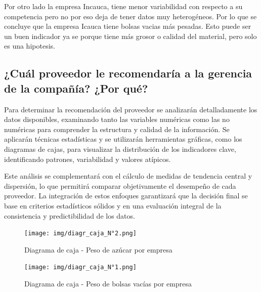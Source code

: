 \documentclass[12pt]{article}
\begin{document}
	Por otro lado la empresa Incauca, tiene menor variabilidad con respecto a su competencia pero no por eso deja de tener datos muy heterogéneos. 
    \vspace{0.5cm}
	Por lo que se concluye que la empresa Icauca tiene bolsas vacias más pesadas. Esto puede ser un buen indicador ya se porque tiene más grosor o calidad del material, pero solo es una hipotesis.

    \subsection{¿Cuál proveedor le recomendaría a la gerencia de la compañía? ¿Por qué?}

Para determinar la recomendación del proveedor se analizarán detalladamente los datos disponibles, examinando tanto las variables numéricas como las no numéricas para comprender la estructura y calidad de la información. Se aplicarán técnicas estadísticas y se utilizarán herramientas gráficas, como los diagramas de cajas, para visualizar la distribución de los indicadores clave, identificando patrones, variabilidad y valores atípicos.  

\vspace{0.5cm}
Este análisis se complementará con el cálculo de medidas de tendencia central y dispersión, lo que permitirá comparar objetivamente el desempeño de cada proveedor. La integración de estos enfoques garantizará que la decisión final se base en criterios estadísticos sólidos y en una evaluación integral de la consistencia y predictibilidad de los datos.

\begin{figure}[ht]
    \centering 
    \begin{minipage}{0.45\textwidth} 
        \centering
        \texttt{[image: img/diagr\_caja\_N°2.png]} 
        \caption{Diagrama de caja - Peso de azúcar por empresa} 
        \label{fig:boxplot_azucar}
    \end{minipage}
    \hfill 
    \begin{minipage}{0.45\textwidth} 
        \centering
        \texttt{[image: img/diagr\_caja\_N°1.png]}
        \caption{Diagrama de caja - Peso de bolsas vacías por empresa}
        \label{fig:boxplot_bolsas}
    \end{minipage}
\end{figure}

\newpage
\end{document}

